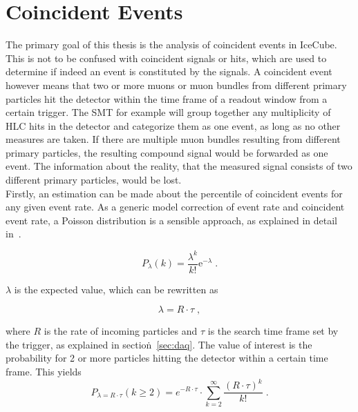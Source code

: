 
\section{Coincident Events}\label{sec:coin}

The primary goal of this thesis is the analysis of coincident events in IceCube. This is not to be confused with coincident signals or hits, which are used 
to determine if indeed an event is constituted by the signals. A coincident event however means that two or more muons or muon bundles from different primary 
particles hit the detector within the 
time frame of a readout window from a certain trigger. The SMT for example will group together any multiplicity of HLC hits in the detector and categorize them as one
event, as long as no other measures are taken. If there are multiple muon bundles resulting from different primary particles, the resulting compound signal would be
forwarded as one event. The information about the reality, that the measured signal consists of two different primary particles, would be lost. \\
Firstly, an estimation can be made about the percentile of coincident events for any given event rate. As a generic model correction of event rate and 
coincident event rate, a Poisson distribution is a sensible approach, as explained in detail in~\cite{Ellis2019}. 

\begin{equation}
    P_{\lambda}(k) = \frac{\lambda^k}{k!}\text{e}^{-\lambda} \; .
\end{equation}

$\lambda$ is the expected value, which can be rewritten as 

\begin{equation}
    \lambda = R \cdot \tau \; ,
\end{equation}

where $R$ is the rate of incoming particles and $\tau$ is the search time frame set by the trigger, as explained in section\.~\ref{sec:daq}. 
The value of interest is the probability for 2 or more particles hitting the detector within a certain time frame. This yields \\

\begin{equation}
    P_{\lambda = R\cdot\tau}(k\geq2) = e^{- R\cdot\tau} \cdot \sum_{k=2}^\infty \frac{{(R\cdot\tau)}^k}{k!} \; .
\end{equation} 

